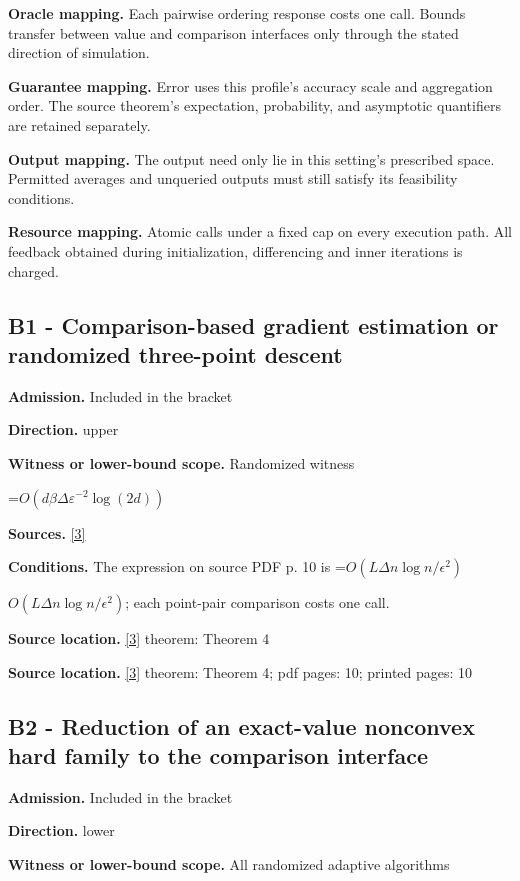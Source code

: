 \documentclass[10pt,a4paper]{article}
\newcommand{\AtlasMath}[1]{\par\begingroup\centering\setbox0=\hbox{$\displaystyle #1$}\ifdim\wd0>1.4\linewidth\typeout{ATLAS WIDE FORMULA: \the\wd0}\fi\ifdim\wd0>\linewidth\resizebox{\linewidth}{!}{\box0}\else\box0\fi\par\endgroup}
\newcommand{\AtlasInlineMath}[1]{\begingroup\setbox0=\hbox{$#1$}\ifdim\wd0>.4\linewidth\endgroup\AtlasMath{#1}\else\endgroup$#1$\fi}
\begin{document}
\textbf{Oracle mapping.} Each pairwise ordering response costs one call. Bounds transfer between value and comparison interfaces only through the stated direction of simulation.

\textbf{Guarantee mapping.} Error uses this profile's accuracy scale and aggregation order. The source theorem's expectation, probability, and asymptotic quantifiers are retained separately.

\textbf{Output mapping.} The output need only lie in this setting's prescribed space. Permitted averages and unqueried outputs must still satisfy its feasibility conditions.

\textbf{Resource mapping.} Atomic calls under a fixed cap on every execution path. All feedback obtained during initialization, differencing and inner iterations is charged.

\subsection{B1 - Comparison-based gradient estimation or randomized three-point descent}
\textbf{Admission.} Included in the bracket

\textbf{Direction.} upper

\textbf{Witness or lower-bound scope.} Randomized witness

\AtlasMath{O(d\beta\Delta\varepsilon^{-2}\log(2d))}
\textbf{Sources.} \href{https://arxiv.org/html/2405.11454v1}{[3]}

\textbf{Conditions.} The expression on source PDF p. 10 is \AtlasInlineMath{O(L\Delta n\log n/\epsilon^2)}; each point-pair comparison costs one call.

\textbf{Source location.} \href{https://arxiv.org/html/2405.11454v1}{[3]} theorem: Theorem 4

\textbf{Source location.} \href{https://arxiv.org/html/2405.11454v1}{[3]} theorem: Theorem 4; pdf pages: 10; printed pages: 10

\subsection{B2 - Reduction of an exact-value nonconvex hard family to the comparison interface}
\textbf{Admission.} Included in the bracket

\textbf{Direction.} lower

\textbf{Witness or lower-bound scope.} All randomized adaptive algorithms
\end{document}
